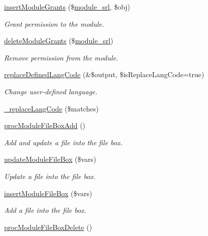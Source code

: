\begin{DoxyCompactItemize}
\hyperlink{classmoduleController_a551eda7765398673c806ca1def44c7ac}{insert\+Module\+Grants} (\$\hyperlink{ko_8install_8php_a370bb6450fab1da3e0ed9f484a38b761}{module\+\_\+srl}, \$obj)
\begin{DoxyCompactList}\small\item\em Grant permission to the module. \end{DoxyCompactList}\item 
\hyperlink{classmoduleController_a34f1a44321986a8f4692be393d6a5c85}{delete\+Module\+Grants} (\$\hyperlink{ko_8install_8php_a370bb6450fab1da3e0ed9f484a38b761}{module\+\_\+srl})
\begin{DoxyCompactList}\small\item\em Remove permission from the module. \end{DoxyCompactList}\item 
\hyperlink{classmoduleController_ace764298e1aee4006ecd8dbf7aaf4007}{replace\+Defined\+Lang\+Code} (\&\$output, \$is\+Replace\+Lang\+Code=true)
\begin{DoxyCompactList}\small\item\em Change user-\/defined language. \end{DoxyCompactList}\item 
\hyperlink{classmoduleController_a0d4e5ad494cacf50288a3f6e9f013a5d}{\+\_\+replace\+Lang\+Code} (\$matches)
\item 
\hyperlink{classmoduleController_a456022e1fca3a204b9b2b828b501fefb}{proc\+Module\+File\+Box\+Add} ()
\begin{DoxyCompactList}\small\item\em Add and update a file into the file box. \end{DoxyCompactList}\item 
\hyperlink{classmoduleController_af1ea81da50538369f648be26252ddd26}{update\+Module\+File\+Box} (\$vars)
\begin{DoxyCompactList}\small\item\em Update a file into the file box. \end{DoxyCompactList}\item 
\hyperlink{classmoduleController_a141cdf2d372314e8661c276cdb8bd889}{insert\+Module\+File\+Box} (\$vars)
\begin{DoxyCompactList}\small\item\em Add a file into the file box. \end{DoxyCompactList}\item 
\hyperlink{classmoduleController_a2b4e5ffa008e6a0a00bfe9844f475b0d}{proc\+Module\+File\+Box\+Delete} ()

\end{DoxyCompactItemize}
